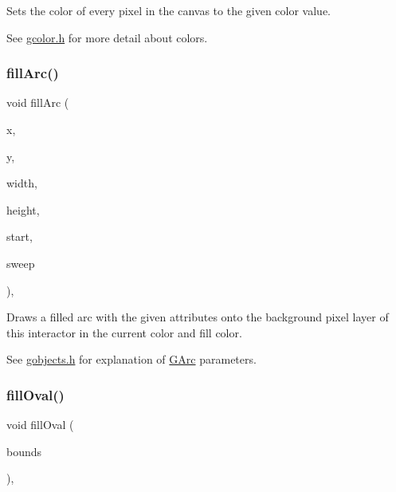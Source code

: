 Sets the color of every pixel in the canvas to the given color value. 

See \mbox{\hyperlink{gcolor_8h_source}{gcolor.\+h}} for more detail about colors. \mbox{\label{classGDrawingSurface_a228075ad18bd97b57f9956568c4773f3}} 
\subsubsection{\texorpdfstring{fill\+Arc()}{fillArc()}}
{\footnotesize\ttfamily void fill\+Arc (\begin{DoxyParamCaption}\item[{double}]{x,  }\item[{double}]{y,  }\item[{double}]{width,  }\item[{double}]{height,  }\item[{double}]{start,  }\item[{double}]{sweep }\end{DoxyParamCaption})\hspace{0.3cm}{\ttfamily [virtual]}, {\ttfamily [inherited]}}



Draws a filled arc with the given attributes onto the background pixel layer of this interactor in the current color and fill color. 

See \mbox{\hyperlink{gobjects_8h_source}{gobjects.\+h}} for explanation of \mbox{\hyperlink{classGArc}{G\+Arc}} parameters. \mbox{\label{classGDrawingSurface_a1ea6e48d59fb588797dba4deab1397e0}} 
\subsubsection{\texorpdfstring{fill\+Oval()}{fillOval()}\hspace{0.1cm}{\footnotesize\ttfamily [1/2]}}
{\footnotesize\ttfamily void fill\+Oval (\begin{DoxyParamCaption}\item[{const \mbox{\hyperlink{classGRectangle}{G\+Rectangle}} \&}]{bounds }\end{DoxyParamCaption})\hspace{0.3cm}{\ttfamily [virtual]}, {\ttfamily [inherited]}}



